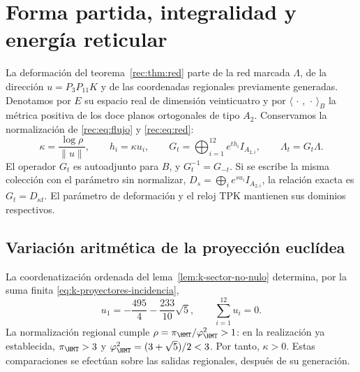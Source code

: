 \section{Forma partida, integralidad y energía reticular}
\label{corpus9:xii:forma-partida}

La deformación del teorema~\ref{rec:thm:red} parte de la red marcada
\(\Lambda\), de la dirección \(u=P_3P_{11}K\) y de las coordenadas
regionales previamente generadas. Denotamos por \(E\) su espacio real
de dimensión veinticuatro y por \(\langle\,\cdot\,,\,\cdot\,\rangle_B\)
la métrica positiva de los doce planos ortogonales de tipo \(A_2\).
Conservamos la normalización de \eqref{rec:eq:flujo} y
\eqref{rec:eq:red}:
\begin{equation}
 \kappa=\frac{\log\rho}{\|u\|},\qquad h_i=\kappa u_i,
 \qquad
 G_t=\bigoplus_{i=1}^{12}e^{th_i}I_{A_{2,i}},\qquad
 \Lambda_t=G_t\Lambda.
 \label{corpus9:xii:normalizacion-flujo}
\end{equation}
El operador \(G_t\) es autoadjunto para \(B\), y
\(G_t^{-1}=G_{-t}\). Si se escribe la misma colección con el parámetro
sin normalizar, \(D_s=\bigoplus_i e^{su_i}I_{A_{2,i}}\), la relación
exacta es \(G_t=D_{\kappa t}\). El parámetro de deformación y el
reloj TPK mantienen sus dominios respectivos.

\subsection{Variación aritmética de la proyección euclídea}
\label{corpus9:xii:variacion-euclidea}

La coordenatización ordenada del lema~\ref{lem:k-sector-no-nulo} determina,
por la suma finita \eqref{eq:k-proyectores-incidencia},
\begin{equation}
 u_1=-\frac{495}{4}-\frac{233}{10}\sqrt5,
 \qquad \sum_{i=1}^{12}u_i=0.
 \label{corpus9:xii:coordenada-testigo}
\end{equation}
La normalización regional cumple \(\rho=\pi_{\HMT}/\varphi_{\HMT}^2>1\):
en la realización ya establecida, \(\pi_{\HMT}>3\) y
\(\varphi_{\HMT}^2=(3+\sqrt5)/2<3\). Por tanto, \(\kappa>0\).
Estas comparaciones se efectúan sobre las salidas regionales, después
de su generación.

